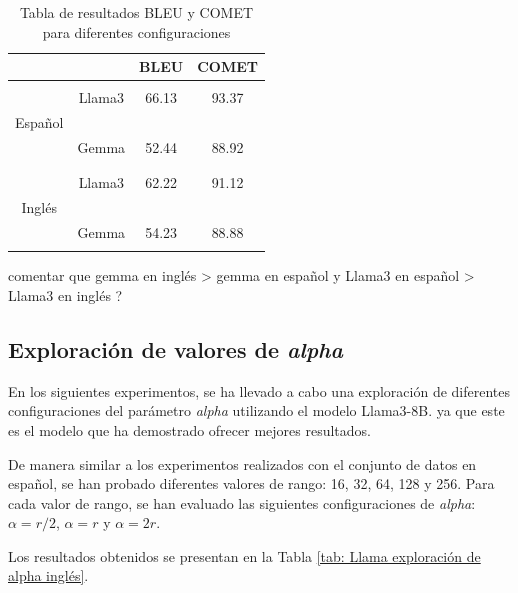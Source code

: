 \documentclass[11pt,spanish,listoffigures,listoftables]{tfgetsinf}
\begin{document}
\begin{table}[h]
\centering
\begin{tabular}{c  c | c c}

             &  & BLEU & COMET \\ 
\hline
\hline
& & & \\
 & Llama3 &   66.13   &   93.37    \\
Español &  &      &       \\
 & Gemma  &   52.44   &    88.92   \\
& & & \\
\hline
& & &  \\
 & Llama3 & 62.22    &   91.12    \\
Inglés &  &      &       \\
 & Gemma  &  54.23    &    88.88   \\
& & &  \\
\end{tabular}
\caption{Tabla de resultados BLEU y COMET para diferentes configuraciones}
\label{tab:comparacionIdiomas}
\end{table}

comentar que gemma en inglés > gemma en español y Llama3 en español > Llama3 en inglés ?

\subsection{Exploración de valores de \textit{alpha}}

En los siguientes experimentos, se ha llevado a cabo una exploración de diferentes configuraciones del parámetro \textit{alpha} utilizando el modelo Llama3-8B. ya que este es el modelo que ha demostrado ofrecer mejores resultados.

De manera similar a los experimentos realizados con el conjunto de datos en español, se han probado diferentes valores de rango: 16, 32, 64, 128 y 256. Para cada valor de rango, se han evaluado las siguientes configuraciones de \textit{alpha}: $\alpha = r/2$, $\alpha = r$ y $\alpha = 2r$.

Los resultados obtenidos se presentan en la Tabla \ref{tab: Llama exploración de alpha inglés}.
\end{document}
